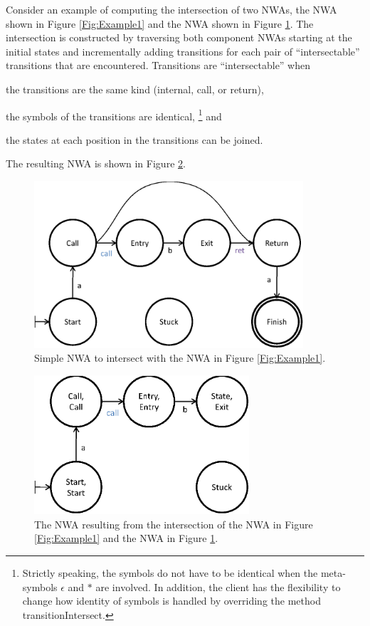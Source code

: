 \documentclass{llncs}
\begin{document}
Consider an example of computing the intersection of two NWAs, the NWA shown in Figure \ref{Fig:Example1} and the NWA shown in Figure \ref{Fig:Intersect1}.  The intersection is constructed by traversing both component NWAs starting at the initial states and incrementally adding transitions for each pair of ``intersectable'' transitions that are encountered.  Transitions are ``intersectable'' when \begin{inparaenum} \item the transitions are the same kind (internal, call, or return), \item the symbols of the transitions are identical, \footnote{Strictly speaking, the symbols do not have to be identical when the meta-symbols $\epsilon$ and $*$ are involved.  In addition, the client has the flexibility to change how identity of symbols is handled by overriding the method transitionIntersect.} and \item the states at each position in the transitions can be joined. \end{inparaenum} The resulting NWA is shown in Figure \ref{Fig:Intersect2}. 
 
\begin{figure}[htbp]
  \centering
    \includegraphics[width=10cm]{Figures/Figure5.eps}
  \caption{Simple NWA to intersect with the NWA in Figure \ref{Fig:Example1}.}
  \label{Fig:Intersect1}
\end{figure}

\begin{figure}[htbp]
  \centering
    \includegraphics[width=8cm]{Figures/Figure6.eps}
  \caption{The NWA resulting from the intersection of the NWA in Figure \ref{Fig:Example1} and the NWA in Figure \ref{Fig:Intersect1}.}
  \label{Fig:Intersect2}
\end{figure}
\end{document}
